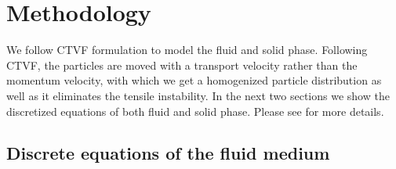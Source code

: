 \section{Methodology}\label{sec2}

We follow CTVF formulation to model the fluid and solid phase. Following CTVF,
the particles are moved with a transport velocity rather than the momentum
velocity, with which we get a homogenized particle distribution as well as it
eliminates the tensile instability. In the next two sections we show the
discretized equations of both fluid and solid phase. Please see
\citep{adepu2021corrected} for more details.

\subsection{Discrete equations of the fluid medium}\label{subsec:discrete-fluid}

